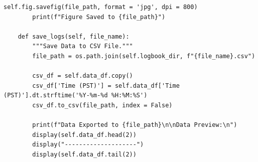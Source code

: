 \documentclass{article}
\begin{document}
\begin{lstlisting}[caption={Source Code : Python Stripchart}, label={lst:stripchart_code}]
        self.fig.savefig(file_path, format = 'jpg', dpi = 800)
        print(f"Figure Saved to {file_path}")

    def save_logs(self, file_name):
        """Save Data to CSV File."""
        file_path = os.path.join(self.logbook_dir, f"{file_name}.csv")

        csv_df = self.data_df.copy()
        csv_df['Time (PST)'] = self.data_df['Time (PST)'].dt.strftime('%Y-%m-%d %H:%M:%S')
        csv_df.to_csv(file_path, index = False)

        print(f"Data Exported to {file_path}\n\nData Preview:\n")
        display(self.data_df.head(2))
        display("--------------------")
        display(self.data_df.tail(2))
\end{lstlisting}
\end{document}
